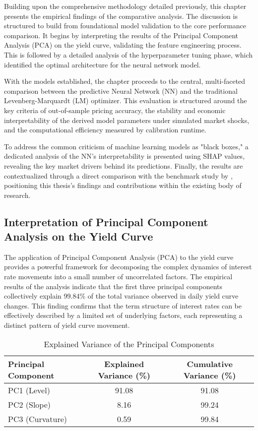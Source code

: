 Building upon the comprehensive methodology detailed previously, this chapter presents the empirical findings of the comparative analysis. The discussion is structured to build from foundational model validation to the core performance comparison. It begins by interpreting the results of the Principal Component Analysis (PCA) on the yield curve, validating the feature engineering process. This is followed by a detailed analysis of the hyperparameter tuning phase, which identified the optimal architecture for the neural network model.

With the models established, the chapter proceeds to the central, multi-faceted comparison between the predictive Neural Network (NN) and the traditional Levenberg-Marquardt (LM) optimizer. This evaluation is structured around the key criteria of out-of-sample pricing accuracy, the stability and economic interpretability of the derived model parameters under simulated market shocks, and the computational efficiency measured by calibration runtime.

To address the common criticism of machine learning models as "black boxes," a dedicated analysis of the NN's interpretability is presented using SHAP values, revealing the key market drivers behind its predictions. Finally, the results are contextualized through a direct comparison with the benchmark study by \textcite{hernandez2016model}, positioning this thesis's findings and contributions within the existing body of research.

\subsection{Interpretation of Principal Component Analysis on the Yield Curve}
The application of Principal Component Analysis (PCA) to the yield curve provides a powerful framework for decomposing the complex dynamics of interest rate movements into a small number of uncorrelated factors. The empirical results of the analysis indicate that the first three principal components collectively explain 99.84\% of the total variance observed in daily yield curve changes. This finding confirms that the term structure of interest rates can be effectively described by a limited set of underlying factors, each representing a distinct pattern of yield curve movement.

\begin{table}[H]
	\centering
	\caption{Explained Variance of the Principal Components}
	\label{tab:pca_variance}
	\begin{tabular}{lcc}
		\toprule
		Principal Component & Explained Variance (\%) & Cumulative Variance (\%) \\
		\midrule
		PC1 (Level)         & 91.08                   & 91.08                    \\
		PC2 (Slope)         & 8.16                    & 99.24                    \\
		PC3 (Curvature)     & 0.59                    & 99.84                    \\
		\bottomrule
	\end{tabular}
\end{table}


